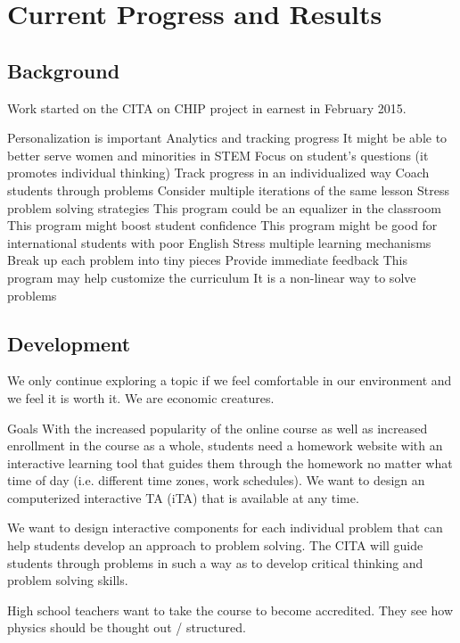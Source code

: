 \chapter[Chapter 4: Current Progress and Results]{Current Progress and Results}

\section{Background}

Work started on the CITA on CHIP project in earnest in February 2015.

Personalization is important
Analytics and tracking progress
It might be able to better serve women and minorities in STEM
Focus on student’s questions (it promotes individual thinking)
Track progress in an individualized way
Coach students through problems
Consider multiple iterations of the same lesson
Stress problem solving strategies
This program could be an equalizer in the classroom
This program might boost student confidence
This program might be good for international students with poor English
Stress multiple learning mechanisms
Break up each problem into tiny pieces
Provide immediate feedback
This program may help customize the curriculum
It is a non-linear way to solve problems

\section{Development}

We only continue exploring a topic if we feel comfortable in our environment and we feel it is worth it. We are economic creatures.

Goals
With the increased popularity of the online course as well as increased enrollment in the course as a whole, students need a homework website with an interactive learning tool that guides them through the homework no matter what time of day (i.e. different time zones, work schedules).  We want to design an computerized interactive TA (iTA) that is available at any time.

We want to design interactive components for each individual problem that can help students develop an approach to problem solving.  The CITA will guide students through problems in such a way as to develop critical thinking and problem solving skills.

High school teachers want to take the course to become accredited.  They see how physics should be thought out / structured.

